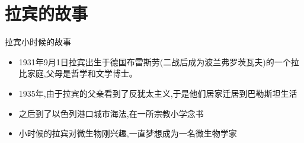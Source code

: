 \documentclass{beamer}
\begin{document}
\section{拉宾的故事}
\begin{frame}{拉宾小时候的故事}
\begin{itemize}
\item<1-> 1931年9月1日拉宾出生于德国布雷斯劳(二战后成为波兰弗罗茨瓦夫)的一个拉比家庭,父母是哲学和文学博士。
\item<3-> 1935年,由于拉宾的父亲看到了反犹太主义,于是他们居家迁居到巴勒斯坦生活
\item<5-> 之后到了以色列港口城市海法,在一所宗教小学念书
\item<6-> 小时候的拉宾对微生物刚兴趣,一直梦想成为一名微生物学家
\end{itemize}
\begin{figure}[htbp]
\end{figure}
\end{frame}
\end{document}
